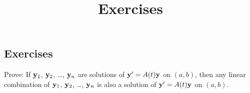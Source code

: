 \documentclass{ximera}
\title{Exercises} \license{CC BY-NC-SA 4.0}
\begin{document}
\begin{abstract}
\end{abstract}
\maketitle

\begin{onlineOnly}
\section*{Exercises}
\end{onlineOnly}

\begin{problem}\label{exer:10.3.1}
Prove: If ${\bf y}_1$, ${\bf y}_2$, \dots, ${\bf y}_n$ are solutions of
${\bf y}'=A(t){\bf y}$ on  $(a,b)$, then any linear
combination of ${\bf y}_1$, ${\bf y}_2$, \dots, ${\bf y}_n$ is also a
solution of ${\bf y}'=A(t){\bf y}$ on $(a,b)$.
\end{problem}
\end{document}
